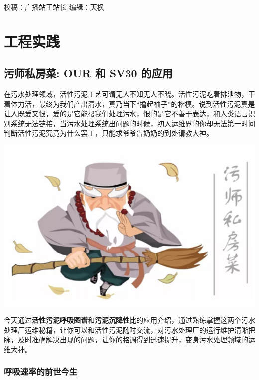 \documentclass[
]{book}
\begin{document}
校稿：广播站王站长
编辑：天枫

\hypertarget{ux5de5ux7a0bux5b9eux8df5}{%
\chapter{工程实践}\label{ux5de5ux7a0bux5b9eux8df5}}

\hypertarget{ux6c61ux5e08ux79c1ux623fux83dc-our-ux548c-sv30-ux7684ux5e94ux7528}{%
\section{污师私房菜: OUR 和 SV30 的应用}\label{ux6c61ux5e08ux79c1ux623fux83dc-our-ux548c-sv30-ux7684ux5e94ux7528}}

在污水处理领域，活性污泥工艺可谓无人不知无人不晓。活性污泥吃着排泄物，干着体力活，最终为我们产出清水，真乃当下``撸起袖子''的楷模。说到活性污泥真是让人既爱又恨，爱的是它能帮我们处理污水，恨的是它不善于表达，和人类语言识别系统无法链接，当污水处理系统出问题的时候，初入运维界的你却无法第一时间判断活性污泥究竟为什么罢工，只能求爷爷告奶奶的到处请教大神。

\includegraphics[width=6.67in]{images/os1}

今天通过\textbf{活性污泥呼吸图谱}和\textbf{污泥沉降性比}的应用介绍，通过熟练掌握这两个污水处理厂运维秘籍，让你可以和活性污泥随时交流，对污水处理厂的运行维护清晰把脉，及时准确解决出现的问题，让你的格调得到迅速提升，变身污水处理领域的运维大神。

\hypertarget{ux547cux5438ux901fux7387ux7684ux524dux4e16ux4ecaux751f}{%
\subsection{呼吸速率的前世今生}\label{ux547cux5438ux901fux7387ux7684ux524dux4e16ux4ecaux751f}}
\end{document}
